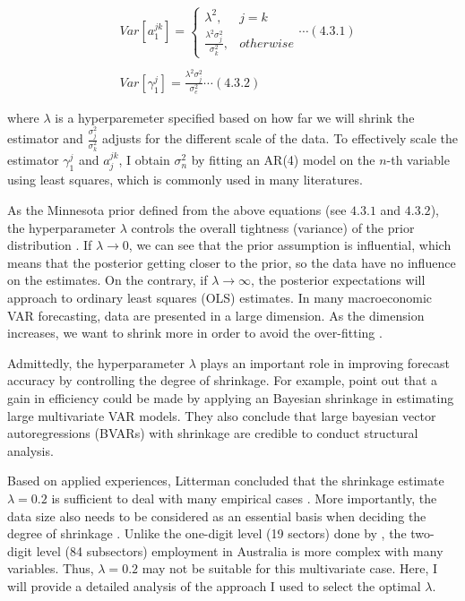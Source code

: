 \documentclass{monashthesis}
\begin{document}
\[
\begin{aligned}
&Var[a_1^{jk}]= 
\begin{cases}
\lambda^2,&j=k\\
\frac{\lambda^2\sigma^2_{j}}{\sigma^2_k},& otherwise
\end{cases}\cdots(4.3.1)\\
\\
&Var[\gamma_1^{j}]=\frac{\lambda^2\sigma^2_{j}}{\sigma^2_e}\cdots(4.3.2)
\end{aligned}
\]

where \(\lambda\) is a hyperparemeter specified based on how far we will shrink the estimator and \(\frac{\sigma^2_{j}}{\sigma^2_k}\) adjusts for the different scale of the data. To effectively scale the estimator \(\gamma^j_1\) and \(a_j^{jk}\), I obtain \(\sigma_n^2\) by fitting an AR(4) model on the \(n\)-th variable using least squares, which is commonly used in many literatures\autocite{anderson2020,banbura2010large,koop2013}.

As the Minnesota prior defined from the above equations (see \(4.3.1\) and \(4.3.2\)), the hyperparameter \(\lambda\) controls the overall tightness (variance) of the prior distribution \autocite{banbura2010large}. If \(\lambda\rightarrow0\), we can see that the prior assumption is influential, which means that the posterior getting closer to the prior, so the data have no influence on the estimates. On the contrary, if \(\lambda\rightarrow\infty\), the posterior expectations will approach to ordinary least squares (OLS) estimates. In many macroeconomic VAR forecasting, data are presented in a large dimension. As the dimension increases, we want to shrink more in order to avoid the over-fitting \autocite{de2008}.

Admittedly, the hyperparameter \(\lambda\) plays an important role in improving forecast accuracy by controlling the degree of shrinkage. For example, \textcite{banbura2010large} point out that a gain in efficiency could be made by applying an Bayesian shrinkage in estimating large multivariate VAR models. They also conclude that large bayesian vector autoregressions (BVARs) with shrinkage are credible to conduct structural analysis.

Based on applied experiences, Litterman concluded that the shrinkage estimate \(\lambda=0.2\) is sufficient to deal with many empirical cases \autocite{litterman1986}. More importantly, the data size also needs to be considered as an essential basis when deciding the degree of shrinkage \autocite{banbura2010large}. Unlike the one-digit level (19 sectors) done by \textcite{anderson2020}, the two-digit level (84 subsectors) employment in Australia is more complex with many variables. Thus, \(\lambda=0.2\) may not be suitable for this multivariate case. Here, I will provide a detailed analysis of the approach I used to select the optimal \(\lambda\).
\end{document}
